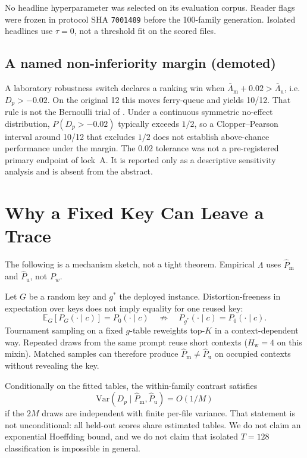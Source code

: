 \documentclass[11pt,a4paper]{article}
\theoremstyle{definition}
\newcommand{\E}{\mathbb{E}}
\newcommand{\LLR}{\Lambda}
\newcommand{\Phatm}{\hat{P}_{\mathrm{m}}}
\newcommand{\Phatu}{\hat{P}_{\mathrm{u}}}
\newcommand{\Hw}{H_{\mathrm{w}}}
\newcommand{\Ktop}{K}
\begin{document}
\noindent No headline hyperparameter was selected on its evaluation
corpus. Reader flags were frozen in protocol SHA \texttt{7001489}
before the 100-family generation. Isolated headlines use $\tau=0$, not
a threshold fit on the scored files.

\subsection{A named non-inferiority margin (demoted)}
\label{sec:margin}

A laboratory robustness switch declares a ranking win when
$\bar\LLR_{\mathrm{m}}+0.02>\bar\LLR_{\mathrm{u}}$, i.e.\ $D_p>-0.02$.
On the original 12 this moves ferry-queue and yields 10/12. That rule is
not the Bernoulli trial of . Under a continuous
symmetric no-effect distribution, $P(D_p>-0.02)$ typically exceeds
$1/2$, so a
Clopper--Pearson interval around 10/12 that excludes $1/2$ does not
establish above-chance performance under the margin. The $0.02$
tolerance was not a pre-registered primary endpoint of lock~A. It is
reported only as a descriptive sensitivity analysis and is absent from
the abstract.

\section{Why a Fixed Key Can Leave a Trace}
\label{sec:math}

The following is a mechanism sketch, not a tight theorem. Empirical
$\LLR$ uses $\Phatm$ and $\Phatu$, not $P_w$.

Let $G$ be a random key and $g^*$ the deployed instance. Distortion-freeness
in expectation over keys does not imply equality for one reused key:
\begin{equation}
\E_{G}[P_{G}(\cdot\mid c)] = P_0(\cdot\mid c)
\quad\not\Rightarrow\quad
P_{g^*}(\cdot\mid c) = P_0(\cdot\mid c).
\label{eq:fixed}
\end{equation}
Tournament sampling on a fixed $g$-table reweights top-$\Ktop$ in a
context-dependent way. Repeated draws from the same prompt reuse short
contexts ($\Hw=4$ on this mixin). Matched samples can therefore produce
$\Phatm\neq\Phatu$ on occupied contexts without revealing the key.

Conditionally on the fitted tables, the within-family contrast satisfies
\[
\mathrm{Var}\!\left(D_p \mid \Phatm,\Phatu\right)
=
O(1/M)
\]
if the $2M$ draws are independent with finite per-file variance. That
statement is not unconditional: all held-out scores share estimated
tables. We do not claim an exponential Hoeffding bound, and we do not
claim that isolated $T=128$ classification is impossible in general.
\end{document}
